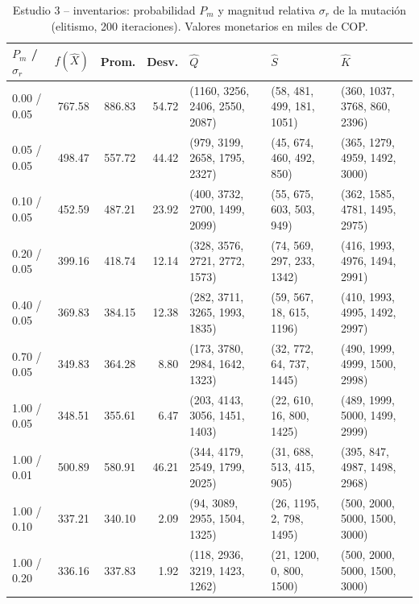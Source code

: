 \begin{table}[!t]
\centering
\scriptsize
\setlength{\tabcolsep}{3pt}
\caption{Estudio 3 -- inventarios: probabilidad $P_m$ y magnitud relativa $\sigma_r$ de la mutaci\'on (elitismo, 200 iteraciones). Valores monetarios en miles de COP.}
\label{tab:t3i}
\begin{tabular}{lrrrlll}
\hline
$P_m$ / $\sigma_r$ & $f(\hat{X})$ & Prom. & Desv. & $\hat{Q}$ & $\hat{S}$ & $\hat{K}$ \\
\hline
0.00 / 0.05 & 767.58 & 886.83 & 54.72 & (1160, 3256, 2406, 2550, 2087) & (58, 481, 499, 181, 1051) & (360, 1037, 3768, 860, 2396) \\
0.05 / 0.05 & 498.47 & 557.72 & 44.42 & (979, 3199, 2658, 1795, 2327) & (45, 674, 460, 492, 850) & (365, 1279, 4959, 1492, 3000) \\
0.10 / 0.05 & 452.59 & 487.21 & 23.92 & (400, 3732, 2700, 1499, 2099) & (55, 675, 603, 503, 949) & (362, 1585, 4781, 1495, 2975) \\
0.20 / 0.05 & 399.16 & 418.74 & 12.14 & (328, 3576, 2721, 2772, 1573) & (74, 569, 297, 233, 1342) & (416, 1993, 4976, 1494, 2991) \\
0.40 / 0.05 & 369.83 & 384.15 & 12.38 & (282, 3711, 3265, 1993, 1835) & (59, 567, 18, 615, 1196) & (410, 1993, 4995, 1492, 2997) \\
0.70 / 0.05 & 349.83 & 364.28 & 8.80 & (173, 3780, 2984, 1642, 1323) & (32, 772, 64, 737, 1445) & (490, 1999, 4999, 1500, 2998) \\
1.00 / 0.05 & 348.51 & 355.61 & 6.47 & (203, 4143, 3056, 1451, 1403) & (22, 610, 16, 800, 1425) & (489, 1999, 5000, 1499, 2999) \\
1.00 / 0.01 & 500.89 & 580.91 & 46.21 & (344, 4179, 2549, 1799, 2025) & (31, 688, 513, 415, 905) & (395, 847, 4987, 1498, 2968) \\
1.00 / 0.10 & 337.21 & 340.10 & 2.09 & (94, 3089, 2955, 1504, 1325) & (26, 1195, 2, 798, 1495) & (500, 2000, 5000, 1500, 3000) \\
1.00 / 0.20 & 336.16 & 337.83 & 1.92 & (118, 2936, 3219, 1423, 1262) & (21, 1200, 0, 800, 1500) & (500, 2000, 5000, 1500, 3000) \\
\hline
\end{tabular}
\end{table}

